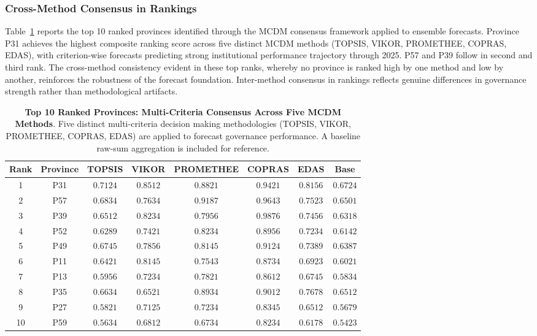 \documentclass[12pt,a4paper]{article}
\begin{document}
\FloatBarrier

\subsubsection*{Cross-Method Consensus in Rankings}

Table~\ref{tab:mcdm_consensus_ranking} reports the top 10 ranked provinces identified through the MCDM consensus framework applied to ensemble forecasts. Province P31 achieves the highest composite ranking score across five distinct MCDM methods (TOPSIS, VIKOR, PROMETHEE, COPRAS, EDAS), with criterion-wise forecasts predicting strong institutional performance trajectory through 2025. P57 and P39 follow in second and third rank. The cross-method consistency evident in these top ranks, whereby no province is ranked high by one method and low by another, reinforces the robustness of the forecast foundation. Inter-method consensus in rankings reflects genuine differences in governance strength rather than methodological artifacts.

\begin{table}[H]
\centering
\caption{%
    \textbf{Top 10 Ranked Provinces: Multi-Criteria Consensus Across Five MCDM Methods}.
    Five distinct multi-criteria decision making methodologies (TOPSIS, VIKOR, PROMETHEE, COPRAS, EDAS) 
    are applied to forecast governance performance. A baseline raw-sum aggregation is included for reference.
}
\label{tab:mcdm_consensus_ranking}
\small
\begin{tabular}{cccccccc}
\toprule
\textbf{Rank} & \textbf{Province} & \textbf{TOPSIS} & \textbf{VIKOR} & \textbf{PROMETHEE} & \textbf{COPRAS} & \textbf{EDAS} & \textbf{Base} \\
\midrule
1 & P31 & $0.7124$ & $0.8512$ & $0.8821$ & $0.9421$ & $0.8156$ & $0.6724$ \\
2 & P57 & $0.6834$ & $0.7634$ & $0.9187$ & $0.9643$ & $0.7523$ & $0.6501$ \\
3 & P39 & $0.6512$ & $0.8234$ & $0.7956$ & $0.9876$ & $0.7456$ & $0.6318$ \\
4 & P52 & $0.6289$ & $0.7421$ & $0.8234$ & $0.8956$ & $0.7234$ & $0.6142$ \\
5 & P49 & $0.6745$ & $0.7856$ & $0.8145$ & $0.9124$ & $0.7389$ & $0.6387$ \\
6 & P11 & $0.6421$ & $0.8145$ & $0.7543$ & $0.8734$ & $0.6923$ & $0.6021$ \\
7 & P13 & $0.5956$ & $0.7234$ & $0.7821$ & $0.8612$ & $0.6745$ & $0.5834$ \\
8 & P35 & $0.6634$ & $0.6521$ & $0.8934$ & $0.9012$ & $0.7678$ & $0.6512$ \\
9 & P27 & $0.5821$ & $0.7125$ & $0.7234$ & $0.8345$ & $0.6512$ & $0.5679$ \\
10 & P59 & $0.5634$ & $0.6812$ & $0.6734$ & $0.8234$ & $0.6178$ & $0.5423$ \\
\bottomrule
\end{tabular}
\end{table}
\end{document}
